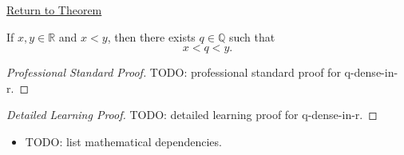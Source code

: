 \newpage
{}
\label{prf:q-dense-in-r}

\begin{remark*}[Return]
\hyperref[thm:q-dense-in-r]{Return to Theorem}
\end{remark*}

\begin{theorem*}[Density of $Q$ in $R$]
If $x,y\in\mathbb{R}$ and $x<y$, then there exists $q\in\mathbb{Q}$ such that
\[
x<q<y.
\]
\end{theorem*}

\begin{proof}[Professional Standard Proof]
\LRAProofBodyStart
TODO: professional standard proof for q-dense-in-r.
\end{proof}

\begin{proof}[Detailed Learning Proof]
\LRAProofBodyStart
TODO: detailed learning proof for q-dense-in-r.
\end{proof}

\begin{remark*}
\end{remark*}

\begin{dependencies}
\begin{itemize}
  \item TODO: list mathematical dependencies.
\end{itemize}
\end{dependencies}

\clearpage
